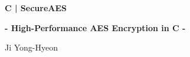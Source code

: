 \documentclass[12pt,openany]{book}
\begin{document}
	
	\begin{titlepage}
		\begin{center}
			{\Huge\textsf{\textbf{C | SecureAES}}\par}
			{\Large\textsf{\textbf{- High-Performance AES Encryption in C -}}\par}
			\vspace{0.5in}
			{\Large {Ji Yong-Hyeon}\par}
			\vspace{1in}
%				
%				
%				
%				

\end{center}
\end{titlepage}
\end{document}
